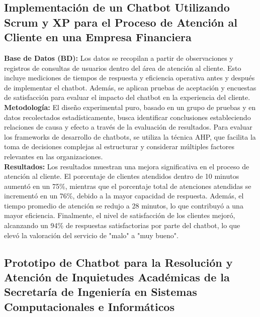 \documentclass[10pt,a4paper]{article}
\begin{document}

\subsection{Implementación de un Chatbot Utilizando Scrum y XP para el Proceso de Atención al Cliente en una Empresa Financiera}

\textbf{Base de Datos (BD):} Los datos se recopilan a partir de observaciones y registros de consultas de usuarios dentro del área de atención al cliente. Esto incluye mediciones de tiempos de respuesta y eficiencia operativa antes y después de implementar el chatbot. Además, se aplican pruebas de aceptación y encuestas de satisfacción para evaluar el impacto del chatbot en la experiencia del cliente. \\

\textbf{Metodología:} El diseño experimental puro, basado en un grupo de pruebas y en datos recolectados estadísticamente, busca identificar conclusiones estableciendo relaciones de causa y efecto a través de la evaluación de resultados. Para evaluar los frameworks de desarrollo de chatbots, se utiliza la técnica AHP, que facilita la toma de decisiones complejas al estructurar y considerar múltiples factores relevantes en las organizaciones. \\

\textbf{Resultados:} Los resultados muestran una mejora significativa en el proceso de atención al cliente. El porcentaje de clientes atendidos dentro de 10 minutos aumentó en un 75\%, mientras que el porcentaje total de atenciones atendidas se incrementó en un 76\%, debido a la mayor capacidad de respuesta. Además, el tiempo promedio de atención se redujo a 28 minutos, lo que contribuyó a una mayor eficiencia. Finalmente, el nivel de satisfacción de los clientes mejoró, alcanzando un 94\% de respuestas satisfactorias por parte del chatbot, lo que elevó la valoración del servicio de "malo" a "muy bueno". \\


\subsection{Prototipo de Chatbot para la Resolución y Atención de Inquietudes Académicas de la Secretaría de Ingeniería en Sistemas Computacionales e Informáticos}
\end{document}
